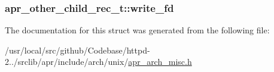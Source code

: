 \subsubsection[{\texorpdfstring{write\+\_\+fd}{write_fd}}]{ apr\+\_\+other\+\_\+child\+\_\+rec\+\_\+t\+::write\+\_\+fd}\hypertarget{structapr__other__child__rec__t_ae73e10a3613921ac266baf2e9278fa37}{}\label{structapr__other__child__rec__t_ae73e10a3613921ac266baf2e9278fa37}


The documentation for this struct was generated from the following file\+:\begin{DoxyCompactItemize}
\item 
/usr/local/src/github/\+Codebase/httpd-\/2../srclib/apr/include/arch/unix/\hyperlink{unix_2apr__arch__misc_8h}{apr\+\_\+arch\+\_\+misc.\+h}\end{DoxyCompactItemize}
